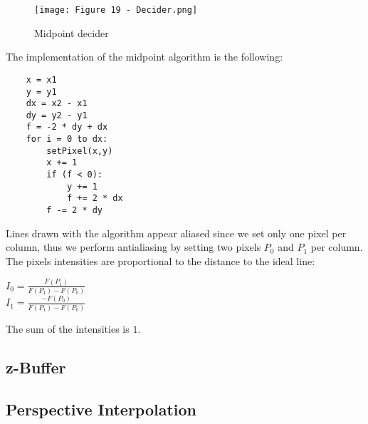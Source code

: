 \documentclass{article}
\begin{document}
\begin{figure}[H]
    \centering
    \texttt{[image: Figure 19 - Decider.png]}
    \caption{Midpoint decider}
\end{figure}
The implementation of the midpoint algorithm is the following:
\begin{verbatim}
    x = x1
    y = y1
    dx = x2 - x1
    dy = y2 - y1
    f = -2 * dy + dx
    for i = 0 to dx:
        setPixel(x,y)
        x += 1
        if (f < 0):
            y += 1
            f += 2 * dx
        f -= 2 * dy
\end{verbatim}
Lines drawn with the algorithm appear aliased since we set only one pixel per column, thus we perform antialiasing by setting two pixels $P_0$ and $P_1$ per column. \\
The pixels intensities are proportional to the distance to the ideal line:
\begin{center}
    $I_0 = \displaystyle\frac{F(P_1)}{F(P_1) - F(P_0)}$ \\
    $I_1 = \displaystyle\frac{-F(P_0)}{F(P_1) - F(P_0)}$
\end{center}
The sum of the intensities is $1$.
\subsection{z-Buffer}
\subsection{Perspective Interpolation}
\end{document}
